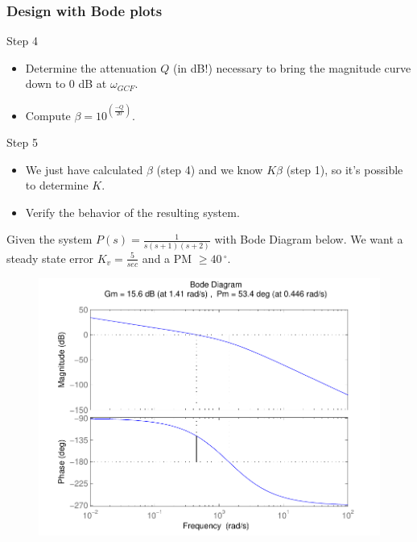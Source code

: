 \begin{frame}
\frametitle{Design with Bode plots}
\begin{block}{Step 4}
	\begin{itemize}
\item Determine the attenuation $Q$ (in dB!) necessary to bring the magnitude curve down to 0 dB at $\omega_{GCF}$. 
\item Compute $\beta = 10^{(\frac{-Q}{20})}$.
\end{itemize}

\end{block}
\begin{block}{Step 5}
	\begin{itemize}
\item 	We just have calculated $\beta$ (step 4) and we know $K\beta$ (step 1), so it's possible to determine $K$.
\item 	Verify the behavior of the resulting system.
\end{itemize}
\end{block}
\end{frame}


\begin{frame}
\begin{example}
Given the system $P(s) = \frac{1}{s(s+1)(s+2)}$ with Bode Diagram below.
We want a steady state error $K_v =\frac{5}{sec}$ and a PM $ \geq 40\,^{\circ}$.
\begin{figure}
	\centering
	\includegraphics[width=0.5
	\linewidth]{examplelag}
\end{figure}
\end{example}
\end{frame}

